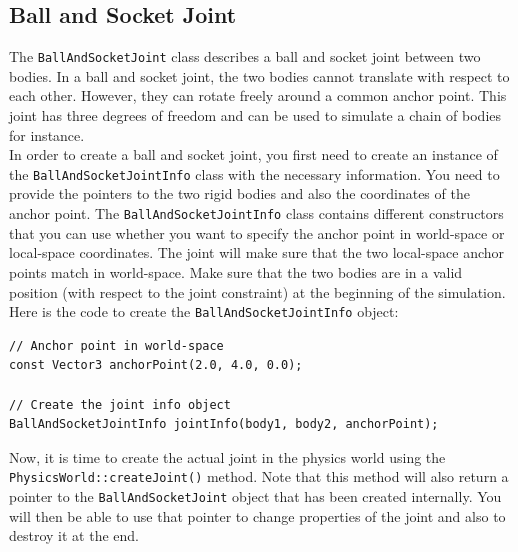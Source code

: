 \documentclass[a4paper,12pt]{article}
\begin{document}
    \subsection{Ball and Socket Joint}

    The \texttt{BallAndSocketJoint} class describes a ball and socket joint between two bodies. In a ball and socket joint, the two bodies cannot
    translate with respect to each other. However, they can rotate freely around a common anchor point. This joint has three degrees of freedom
    and can be used to simulate a chain of bodies for instance. \\

    In order to create a ball and socket joint, you first need to create an instance of the \texttt{BallAndSocketJointInfo} class with the necessary
    information. You need to provide the pointers to the two rigid bodies and also the coordinates of the anchor point. The \texttt{BallAndSocketJointInfo}
    class contains different constructors that you can use whether you want to specify the anchor point in world-space or local-space coordinates.
    The joint will make sure that the two local-space anchor points match in world-space. Make sure that the two bodies are in a valid position (with
    respect to the joint constraint) at the beginning of the simulation. \\

    Here is the code to create the \texttt{BallAndSocketJointInfo} object: \\

    \begin{lstlisting}
// Anchor point in world-space
const Vector3 anchorPoint(2.0, 4.0, 0.0);

// Create the joint info object
BallAndSocketJointInfo jointInfo(body1, body2, anchorPoint);
  \end{lstlisting}

    \vspace{0.6cm}

    \begin{sloppypar}
    Now, it is time to create the actual joint in the physics world using the \texttt{PhysicsWorld::createJoint()} method.
    Note that this method will also return a pointer to the \texttt{BallAndSocketJoint} object that has been created internally. You will then
    be able to use that pointer to change properties of the joint and also to destroy it at the end. \\
    \end{sloppypar}
\end{document}

